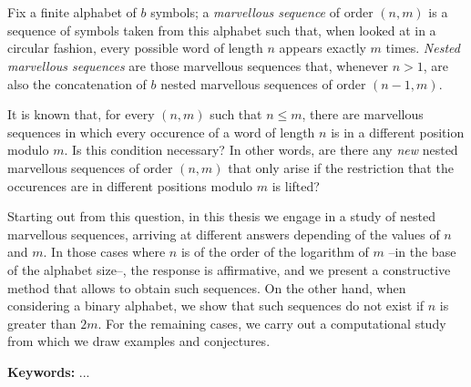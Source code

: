 \chapter*{\runtitle}

Fix a finite alphabet of $b$ symbols; a \emph{marvellous sequence} of
order $(n,m)$ is a sequence of symbols taken from this alphabet such that,
when looked at in a circular fashion, every possible word of length $n$ appears
exactly $m$ times.
\emph{Nested marvellous sequences} are those marvellous sequences that, whenever
$n > 1$, are also the concatenation of $b$ nested marvellous sequences of order
$(n-1,m)$.

It is known that, for every $(n,m)$ such that $n \leq m$, there are marvellous
sequences in which every occurence of a word of length $n$ is in a different
position modulo $m$. Is this condition necessary? In other words,
are there any \emph{new} nested marvellous sequences of order $(n,m)$ that only
arise if the restriction that the occurences are in different positions modulo
$m$ is lifted?

Starting out from this question, in this thesis we engage in a study of nested
marvellous sequences, arriving at different answers depending of the values of
$n$ and $m$. In those cases where $n$ is of the order of the logarithm of $m$
--in the base of the alphabet size--, the response is affirmative, and we
present a constructive method that allows to obtain such sequences. On the other
hand, when considering a binary alphabet, we show that such sequences do not
exist if $n$ is greater than $2m$.
For the remaining cases, we carry out a computational study from which we
draw examples and conjectures.

\bigskip

\noindent\textbf{Keywords:} ...